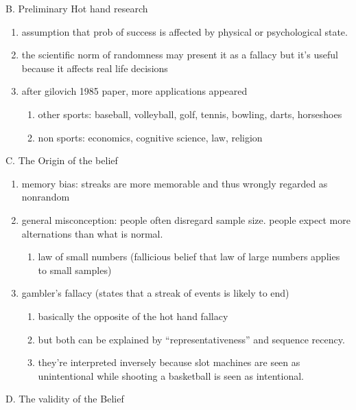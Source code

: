 \documentclass[12pt,twoside]{dukestatscithesis}
\providecommand{\tightlist}{%
  \setlength{\itemsep}{0pt}\setlength{\parskip}{0pt}}
\theoremstyle{definition}
\theoremstyle{definition}
\theoremstyle{definition}
\theoremstyle{remark}
\begin{document}
B. Preliminary Hot hand research
\begin{enumerate}
\def\labelenumi{\arabic{enumi}.}
\tightlist
\item
  assumption that prob of success is affected by physical or
  psychological state.
\item
  the scientific norm of randomness may present it as a fallacy but it's
  useful because it affects real life decisions
\item
  after gilovich 1985 paper, more applications appeared
  \begin{enumerate}
  \def\labelenumii{\alph{enumii}.}
  \tightlist
  \item
    other sports: baseball, volleyball, golf, tennis, bowling, darts,
    horseshoes
  \item
    non sports: economics, cognitive science, law, religion
  \end{enumerate}
\end{enumerate}
C. The Origin of the belief
\begin{enumerate}
\def\labelenumi{\arabic{enumi}.}
\tightlist
\item
  memory bias: streaks are more memorable and thus wrongly regarded as
  nonrandom
\item
  general misconception: people often disregard sample size. people
  expect more alternations than what is normal.
  \begin{enumerate}
  \def\labelenumii{\alph{enumii}.}
  \tightlist
  \item
    law of small numbers (fallicious belief that law of large numbers
    applies to small samples)
  \end{enumerate}
\item
  gambler's fallacy (states that a streak of events is likely to end)
  \begin{enumerate}
  \def\labelenumii{\alph{enumii}.}
  \tightlist
  \item
    basically the opposite of the hot hand fallacy
  \item
    but both can be explained by ``representativeness'' and sequence
    recency.
  \item
    they're interpreted inversely because slot machines are seen as
    unintentional while shooting a basketball is seen as intentional.
  \end{enumerate}
\end{enumerate}
D. The validity of the Belief
\end{document}
